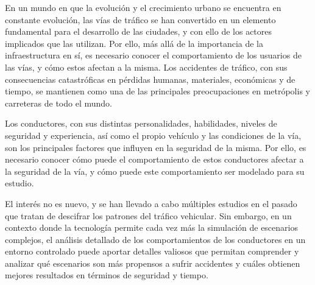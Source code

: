 En un mundo en que la evolución y el crecimiento urbano se encuentra en constante evolución, las vías de tráfico se han convertido
en un elemento fundamental para el desarrollo de las ciudades, y con ello de los actores implicados que las utilizan. Por ello, más allá
de la importancia de la infraestructura en sí, es necesario conocer el comportamiento de los usuarios de las vías, y cómo estos afectan
a la misma. Los accidentes de tráfico, con sus consecuencias catastróficas en pérdidas humanas, materiales, económicas y de tiempo,
se mantienen como una de las principales preocupaciones en metrópolis y carreteras de todo el mundo.

Los conductores, con sus distintas personalidades, habilidades, niveles de seguridad y experiencia, así como el propio vehículo y
las condiciones de la vía, son los principales factores que influyen en la seguridad de la misma. Por ello, es necesario conocer
cómo puede el comportamiento de estos conductores afectar a la seguridad de la vía, y cómo puede este comportamiento ser modelado
para su estudio.

El interés no es nuevo, y se han llevado a cabo múltiples estudios en el pasado que tratan de descifrar los patrones del tráfico vehicular.
Sin embargo, en un contexto donde la tecnología permite cada vez más la simulación de escenarios complejos, el análisis detallado de los comportamientos
de los conductores en un entorno controlado puede aportar detalles valiosos que permitan comprender y analizar qué escenarios son más
propensos a sufrir accidentes y cuáles obtienen mejores resultados en términos de seguridad y tiempo.